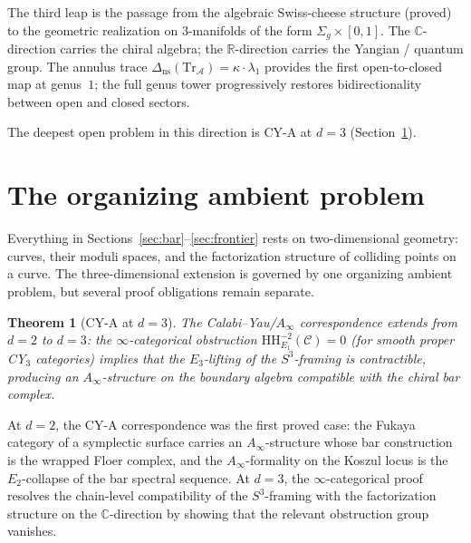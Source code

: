 \documentclass[11pt,reqno]{amsart}
\newtheorem{theorem}{Theorem}[section]
\theoremstyle{definition}
\theoremstyle{remark}
\newcommand{\cA}{\mathcal{A}}
\numberwithin{equation}{section}
\begin{document}
The third leap is the passage from the algebraic
Swiss-cheese structure (proved) to the geometric
realization on $3$-manifolds of the form
$\Sigma_g \times [0,1]$. The $\mathbb{C}$-direction
carries the chiral algebra; the $\mathbb{R}$-direction
carries the Yangian / quantum group. The annulus trace
$\Delta_{\mathrm{ns}}(\mathrm{Tr}_\cA) =
\kappa \cdot \lambda_1$
provides the first open-to-closed map at genus~$1$;
the full genus tower progressively restores
bidirectionality between open and closed sectors.

The deepest open problem in this direction is CY-A at
$d = 3$ (Section~\ref{sec:open-problem}).


\section{The organizing ambient problem}
\label{sec:open-problem}

Everything in Sections~\ref{sec:bar}--\ref{sec:frontier}
rests on two-dimensional geometry: curves, their moduli
spaces, and the factorization structure of colliding points
on a curve. The three-dimensional extension is governed by one
organizing ambient problem, but several proof obligations remain
separate.

\begin{theorem}[CY-A at $d = 3$]\label{thm:cy-a3}
The Calabi--Yau/$A_\infty$ correspondence extends from
$d = 2$ to $d = 3$: the $\infty$-categorical obstruction
$\mathrm{HH}^{-2}_{E_1}(\mathcal{C}) = 0$ (for smooth proper
CY$_3$ categories) implies that the $E_3$-lifting of the
$S^3$-framing is contractible, producing an
$A_\infty$-structure on the boundary algebra compatible
with the chiral bar complex.
\end{theorem}

At $d = 2$, the CY-A correspondence was the first proved
case: the Fukaya category of a symplectic surface carries an
$A_\infty$-structure whose bar construction is the wrapped
Floer complex, and the $A_\infty$-formality on the Koszul
locus is the $E_2$-collapse of the bar spectral sequence.
At $d = 3$, the $\infty$-categorical proof resolves the
chain-level compatibility of the $S^3$-framing with
the factorization structure on the $\mathbb{C}$-direction
by showing that the relevant obstruction group vanishes.
\end{document}
